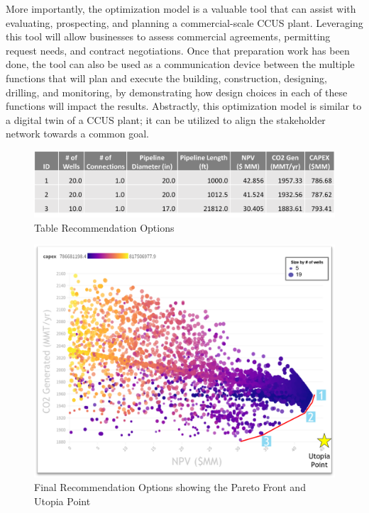 \documentclass[balance,upint,subscriptcorrection,varvw,mathalfa=cal=boondoxo,spanish,french,vietnamese,russian,greek,pdf-a,colorlinks]{asmeconf}
\begin{document}
More importantly, the optimization model is a valuable tool that can assist with evaluating, prospecting, and planning a commercial-scale CCUS plant. Leveraging this tool will allow businesses to assess commercial agreements, permitting request needs, and contract negotiations. Once that preparation work has been done, the tool can also be used as a communication device between the multiple functions that will plan and execute the building, construction, designing, drilling, and monitoring, by demonstrating how design choices in each of these functions will impact the results. Abstractly, this optimization model is similar to a digital twin of a CCUS plant; it can be utilized to align the stakeholder network towards a common goal. 

\begin{figure}
\centering\includegraphics[width=1\linewidth]{images/Options_Table.png}
\caption{Table Recommendation Options}
\label{Options_Table}
\end{figure}

\begin{figure}
\centering\includegraphics[width=1\linewidth]{images/Final Recommendation.png}
\caption{Final Recommendation Options showing the Pareto Front and Utopia Point}
\label{Final Recommendation}
\end{figure}
\end{document}
